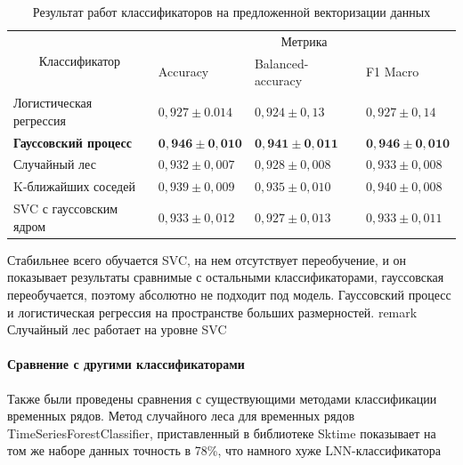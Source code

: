\documentclass[12pt, twoside]{article}
\begin{document}
\begin{table}[H]
    \centering
    \begin{tabular}{|l|lll|}
    \hline
    \multicolumn{1}{|c|}{\multirow{2}{*}{Классификатор}} & \multicolumn{3}{c|}{Метрика}                                                                     \\ \cline{2-4} 
    \multicolumn{1}{|c|}{}                               & \multicolumn{1}{l|}{Accuracy}         & \multicolumn{1}{l|}{Balanced-accuracy} & F1 Macro        \\ \hline
    Логистическая регрессия                              & \multicolumn{1}{l|}{$0,927 \pm  0.014$} & \multicolumn{1}{l|}{$0,924 \pm 0,13$}    & $0,927 \pm 0,14$  \\ \hline
    \textbf{Гауссовский процесс}                                  & \multicolumn{1}{l|}{$\mathbf{0,946} \pm \mathbf{0,010}$}  & \multicolumn{1}{l|}{$\mathbf{0,941} \pm \mathbf{0,011}$}   & $\mathbf{0,946} \pm \mathbf{0,010}$ \\ \hline
    Случайный лес                                        & \multicolumn{1}{l|}{$0,932 \pm 0,007$}  & \multicolumn{1}{l|}{$0,928 \pm 0,008$}   & $0,933 \pm 0,008$ \\ \hline
    K-ближайших соседей                                  & \multicolumn{1}{l|}{$0,939 \pm 0,009$}  & \multicolumn{1}{l|}{$0,935 \pm 0,010$}   & $0,940 \pm 0,008$ \\ \hline
    SVC с гауссовским ядром                              & \multicolumn{1}{l|}{$0,933 \pm 0,012$}  & \multicolumn{1}{l|}{$0,927 \pm 0,01$3}   & $0,933 \pm 0,011$ \\ \hline
    \end{tabular}
    \caption{Результат работ классификаторов на предложенной векторизации данных}
    \label{table:classifictors}
\end{table}

Стабильнее всего обучается SVC, на нем отсутствует переобучение, и он показывает результаты сравнимые с остальными классификаторами, гауссовская переобучается, поэтому абсолютно не подходит под модель. Гауссовский процесс и логистическая регрессия на пространстве больших размерностей. remark Случайный лес работает на уровне SVC

\paragraph{Сравнение с другими классификаторами}
Также были проведены сравнения с существующими методами классификации временных рядов. Метод случайного леса для временных рядов TimeSeriesForestClassifier, приставленный в библиотеке Sktime показывает на том же наборе данных точность в 78\%, что намного хуже LNN-классификатора
\end{document}
